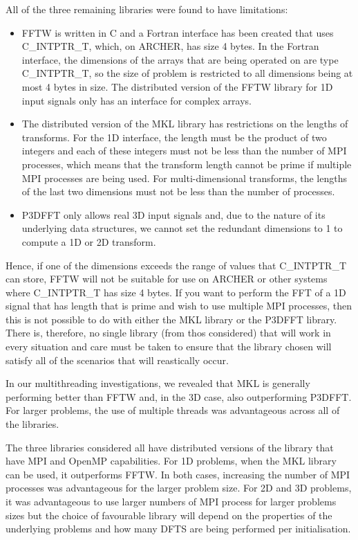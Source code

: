 \documentclass[a4paper]{article}
\begin{document}
All of the three remaining libraries were found to have limitations:
\begin{itemize}
\item FFTW is written in C and a Fortran interface has been created
  that uses C\_INTPTR\_T, which, on ARCHER, has size 4 bytes. In the
  Fortran interface, the dimensions of the arrays that are being
  operated on are type C\_INTPTR\_T, so the size of problem is
  restricted to all dimensions being at most 4 bytes in size. The
  distributed version of the FFTW library for 1D input signals only
  has an interface for complex arrays.
 \item The distributed version of the MKL library has restrictions on
   the lengths of transforms. For the 1D interface, the length must be the
   product of two integers and each of these integers must not be less
   than the number of MPI processes, which means that the transform
   length cannot be prime if multiple MPI processes are being
   used. For multi-dimensional transforms, the lengths of the last two
   dimensions must not be less than the number of processes.
 \item P3DFFT only allows real 3D input signals and, due to the nature
   of its underlying data structures, we cannot set the redundant
   dimensions to 1 to compute a 1D or 2D transform.

\end{itemize}
Hence, if one of the dimensions exceeds the range of values that
C\_INTPTR\_T can store, FFTW will not be suitable for use on ARCHER or
other systems where C\_INTPTR\_T has size 4 bytes. If you want to
perform the FFT of a 1D signal that has length that is prime and wish
to use multiple MPI processes, then this is not possible to do with
either the MKL library or the P3DFFT library. There is, therefore, no
single library (from thos considered) that will work in every
situation and care must be taken to ensure that the library chosen
will satisfy all of the scenarios that will reastically occur.

In our multithreading investigations, we revealed that MKL is
generally performing better than FFTW and, in the 3D case, also
outperforming P3DFFT. For larger problems, the use of multiple threads
was advantageous across all of the libraries.

The three libraries considered all have distributed versions of the
library that have MPI and OpenMP capabilities. For 1D problems, when
the MKL library can be used, it outperforms FFTW. In both cases,
increasing the number of MPI processes was advantageous for the larger
problem size. For 2D and 3D problems, it was advantageous to use
larger numbers of MPI process for larger problems sizes but the choice
of favourable library will depend on the properties of the underlying
problems and how many DFTS are being performed per initialisation.
\end{document}
